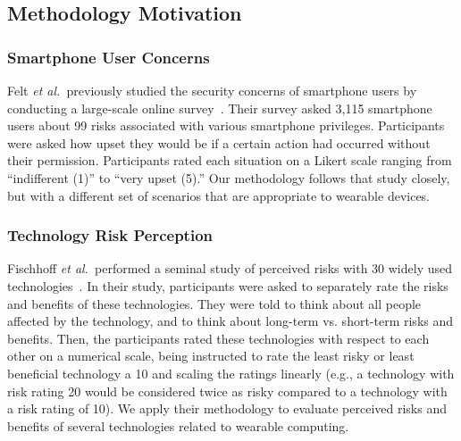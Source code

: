 \documentclass{acm_proc_article-sp}
\def\etal{{\it et al.~}}
\begin{document}


 

\subsection{Methodology Motivation}

\subsubsection{Smartphone User Concerns}
Felt \etal previously studied the security concerns of smartphone users by conducting a large-scale online survey~\cite{Felt}. Their survey asked 3,115 smartphone users about 99 risks associated with various smartphone privileges. Participants were asked how upset they would be if a certain action had occurred without their permission. Participants rated each situation on a Likert scale ranging from ``indifferent (1)'' to ``very upset (5).''
Our methodology follows that study closely, but with a different set of scenarios that are appropriate to wearable devices.

\subsubsection{Technology Risk Perception}
Fischhoff \etal performed a seminal study of perceived risks with 30 widely used technologies~\cite{Fischhoff}. In their study, participants were asked to separately rate the risks and benefits of these technologies. They were told to think about all people affected by the technology, and to think about long-term vs. short-term risks and benefits. Then, the participants rated these technologies with respect to each other on a numerical scale, being instructed to rate the least risky or least beneficial technology a 10 and scaling the ratings linearly (e.g., a technology with risk rating 20 would be considered twice as risky compared to a technology with a risk rating of 10).
We apply their methodology to evaluate perceived risks and benefits of several technologies related to wearable computing.
\end{document}
